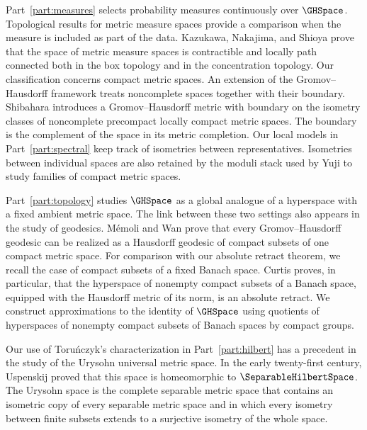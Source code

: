 Part~\ref{part:measures} selects probability measures continuously over
$\GHSpace$.
Topological results for metric measure spaces provide a comparison when
the measure is included as part of the data.
Kazukawa,
Nakajima,
and Shioya
\cite[arXiv v1, Theorems~1.4--1.6]{KazukawaNakajimaShioya2024}
prove that the space of metric measure spaces is contractible and locally
path connected both in the box topology and in the concentration topology.
Our classification concerns compact metric spaces.
An extension of the Gromov--Hausdorff framework treats noncomplete spaces
together with their boundary.
Shibahara
\cite[arXiv v1, Definition~3.2 and Theorem~1.1]{Shibahara2021Boundary}
introduces a Gromov--Hausdorff metric with boundary on the isometry classes
of noncomplete precompact locally compact metric spaces.
The boundary is the complement of the space in its metric completion.
Our local models in Part~\ref{part:spectral} keep track of isometries
between representatives.
Isometries between individual spaces are also retained by the moduli stack
used by
Yuji
\cite[arXiv v2, Definition~5.1]{Yuji2026ModuliStack}
to study families of compact metric spaces.


Part~\ref{part:topology} studies
$\GHSpace$
as a global analogue of a hyperspace with a fixed ambient metric space.
The link between these two settings also appears in the study of geodesics.
M\'emoli and Wan
\cite[arXiv v2, Theorem~1]{MemoliWan2023}
prove that every Gromov--Hausdorff geodesic can be realized as a Hausdorff
geodesic of compact subsets of one compact metric space.
For comparison with our absolute retract theorem,
we recall the case of compact subsets of a fixed Banach space.
Curtis
\cite[Theorem~1.6]{Curtis1980}
proves,
in particular,
that the hyperspace of nonempty compact subsets of a Banach space,
equipped with the Hausdorff metric of its norm,
is an absolute retract.
We construct approximations to the identity of
$\GHSpace$
using quotients of hyperspaces of nonempty compact subsets of Banach spaces
by compact groups.

Our use of Toru\'nczyk's characterization in Part~\ref{part:hilbert}
has a precedent in the study of the Urysohn universal metric space.
In the early twenty-first century,
Uspenskij
\cite[arXiv v1, Theorem~2.1]{Uspenskij2004Urysohn}
proved that this space is homeomorphic to
$\SeparableHilbertSpace$.
The Urysohn space is the complete separable metric space that contains
an isometric copy of every separable metric space and in which every isometry
between finite subsets extends to a surjective isometry of the whole space.


